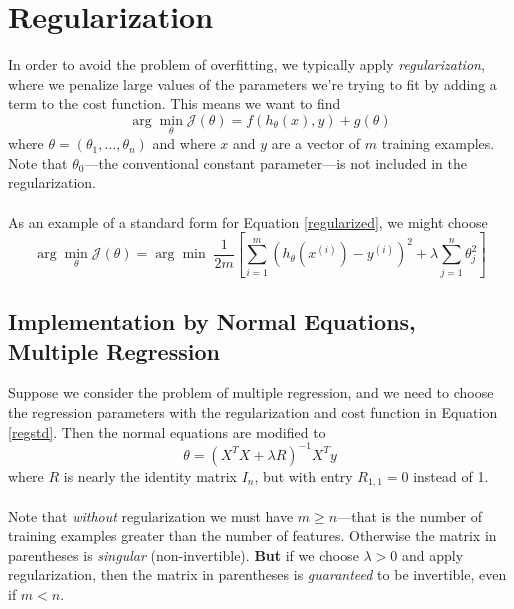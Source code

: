 \documentclass[12pt]{article}
\begin{document}
\section{Regularization}

In order to avoid the problem of overfitting, we typically apply
\emph{regularization}, where we penalize large values of the
parameters we're trying to fit by adding a term to the cost
function. This means we want to find
\begin{equation}
   \label{regularized}
   \arg \min_\theta \mathcal{J}(\theta) = f\left(h_\theta(x), y\right)
   + g(\theta)
\end{equation}
where $\theta = (\theta_1, \ldots, \theta_n)$ and where $x$ and
$y$ are a vector of $m$ training examples. Note that 
$\theta_0$---the conventional constant parameter---is not included
in the regularization.
\\
\\
As an example of a standard form for Equation \ref{regularized}, 
we might choose
\begin{equation}
   \label{regstd}
   \arg \min_\theta \mathcal{J}(\theta) = \arg\min \;
   \frac{1}{2m}\left[ \sum^m_{i=1} \left(h_\theta(x^{(i)})-y^{(i)}
   \right)^2 + \lambda \sum^n_{j=1} \theta_j^2
   \right]
\end{equation}


\subsection{Implementation by Normal Equations, Multiple Regression}

Suppose we consider the problem of multiple regression, and we
need to choose the regression parameters with the regularization
and cost function in Equation \ref{regstd}. Then the normal equations
are modified to
\begin{equation}
   \label{normreg}
   \theta = \left(X^T X + \lambda R\right)^{-1}  X^T y
\end{equation}
where $R$ is nearly the identity matrix $I_n$, but with entry 
$R_{1,1}=0$ instead of 1.
\\
\\
Note that \emph{without} regularization
we must have $m\geq n$---that is the number of training
examples greater than the number of features. Otherwise the 
matrix in parentheses is \emph{singular} (non-invertible). 
\textbf{But} if we choose $\lambda>0$ and apply regularization,
then the matrix in parentheses is \emph{guaranteed} to 
be invertible, even if $m < n$.
\end{document}
